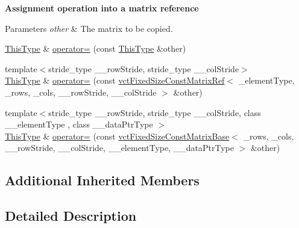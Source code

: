 \begin{Indent}{\bf Assignment operation into a matrix reference}\par
{\em 
\begin{DoxyParams}{Parameters}
{\em other} & The matrix to be copied. \\
\hline
\end{DoxyParams}
}\begin{DoxyCompactItemize}
\item 
\hyperlink{classvct_fixed_size_matrix_ref_a29a621c8e22f250f9033e539ad219f95}{This\+Type} \& \hyperlink{classvct_fixed_size_matrix_ref_a9876d6b470ee918dc7ab454fdeeda582}{operator=} (const \hyperlink{classvct_fixed_size_matrix_ref_a29a621c8e22f250f9033e539ad219f95}{This\+Type} \&other)
\item 
{\footnotesize template$<$stride\+\_\+type \+\_\+\+\_\+row\+Stride, stride\+\_\+type \+\_\+\+\_\+col\+Stride$>$ }\\\hyperlink{classvct_fixed_size_matrix_ref_a29a621c8e22f250f9033e539ad219f95}{This\+Type} \& \hyperlink{classvct_fixed_size_matrix_ref_a4c3e05d0a8dfa378946e1871e12f4b0b}{operator=} (const \hyperlink{classvct_fixed_size_const_matrix_ref}{vct\+Fixed\+Size\+Const\+Matrix\+Ref}$<$ \+\_\+element\+Type, \+\_\+rows, \+\_\+cols, \+\_\+\+\_\+row\+Stride, \+\_\+\+\_\+col\+Stride $>$ \&other)
\item 
{\footnotesize template$<$stride\+\_\+type \+\_\+\+\_\+row\+Stride, stride\+\_\+type \+\_\+\+\_\+col\+Stride, class \+\_\+\+\_\+element\+Type , class \+\_\+\+\_\+data\+Ptr\+Type $>$ }\\\hyperlink{classvct_fixed_size_matrix_ref_a29a621c8e22f250f9033e539ad219f95}{This\+Type} \& \hyperlink{classvct_fixed_size_matrix_ref_a4d2c04a081b66662b946158b08722180}{operator=} (const \hyperlink{classvct_fixed_size_const_matrix_base}{vct\+Fixed\+Size\+Const\+Matrix\+Base}$<$ \+\_\+rows, \+\_\+cols, \+\_\+\+\_\+row\+Stride, \+\_\+\+\_\+col\+Stride, \+\_\+\+\_\+element\+Type, \+\_\+\+\_\+data\+Ptr\+Type $>$ \&other)
\end{DoxyCompactItemize}
\end{Indent}
\subsection*{Additional Inherited Members}


\subsection{Detailed Description}
